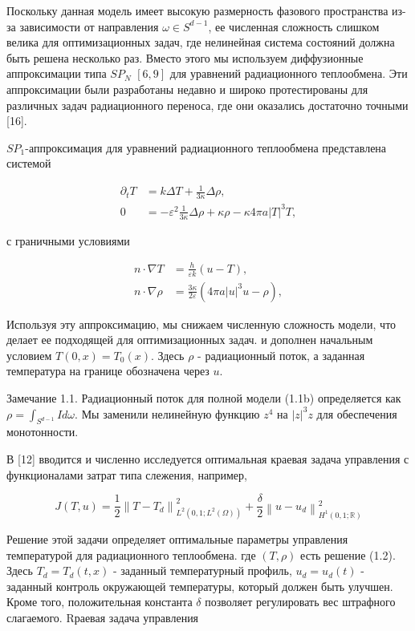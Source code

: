 Поскольку данная модель имеет высокую размерность фазового пространства
из-за зависимости от направления $\omega \in S^{d-1}$, ее численная сложность
слишком велика для оптимизационных задач,
где нелинейная система состояний должна быть решена несколько раз.
Вместо этого мы используем диффузионные аппроксимации типа $S P_{N}$ $[6,9]$
для уравнений радиационного теплообмена.
Эти аппроксимации были разработаны недавно и широко протестированы
для различных задач радиационного переноса,
где они оказались достаточно точными [16].

$S P_{1}$-аппроксимация для уравнений радиационного теплообмена представлена системой

\[
    \begin{aligned}
        \partial_{t} T & =k \Delta T+\frac{1}{3 \kappa} \Delta \rho, \\
        0 & =-\varepsilon^{2} \frac{1}{3 \kappa} \Delta \rho+\kappa \rho-\kappa 4 \pi a|T|^{3} T,
    \end{aligned}
\]

с граничными условиями

\[
    \begin{aligned}
        n \cdot \nabla T & =\frac{h}{\varepsilon k}(u-T), \\
        n \cdot \nabla \rho & =\frac{3 \kappa}{2 \varepsilon}
        \left(4 \pi a|u|^{3} u-\rho\right),
    \end{aligned}
\]


Используя эту аппроксимацию, мы снижаем численную сложность модели,
что делает ее подходящей для оптимизационных задач.
и дополнен начальным условием $T(0, x) = T_{0}(x)$.
Здесь $\rho$ - радиационный поток,
а заданная температура на границе обозначена через $u$.

Замечание 1.1. Радиационный поток для полной модели (1.1b) определяется
как $\rho = \int_{S^{d-1}} I d \omega$.
Мы заменили нелинейную функцию $z^{4}$ на $|z|^{3} z$ для обеспечения монотонности.

В [12] вводится и численно исследуется оптимальная краевая задача управления
с функционалами затрат типа слежения, например,

\[
    J(T, u) = \frac{1}{2}\left\|T - T_{d}\right\|_{L^{2}\left(0,1 ; L^{2}(\Omega)\right)}^{2}
    + \frac{\delta}{2}\left\|u - u_{d}\right\|_{H^{1}(0,1 ; \mathbb{R})}^{2}
\]


Решение этой задачи определяет оптимальные параметры
управления температурой для радиационного теплообмена.
где $(T, \rho)$ есть решение (1.2).
Здесь $T_{d} = T_{d}(t, x)$ - заданный температурный профиль,
$u_{d} = u_{d}(t)$ - заданный контроль окружающей температуры,
который должен быть улучшен.
Кроме того, положительная константа $\delta$ позволяет регулировать вес штрафного слагаемого.
Rраевая задача управления

